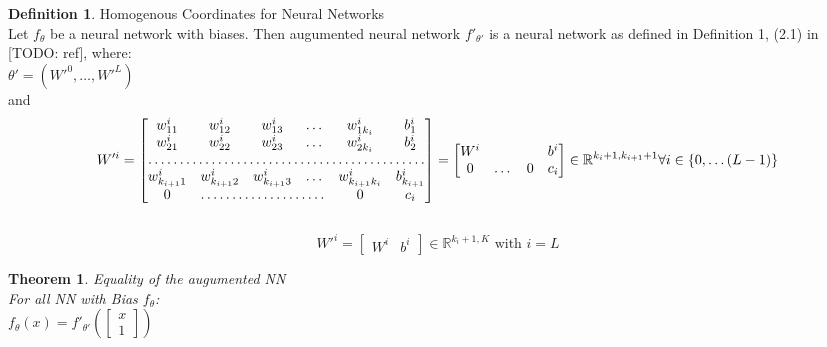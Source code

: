 \documentclass[a4paper]{article}
\newtheorem{theorem}{Theorem}[section]
\theoremstyle{definition}
\newtheorem{definition}{Definition}[section]
\begin{document}
\theoremstyle{definition}
\begin{definition}{Homogenous Coordinates for Neural Networks}\\
Let $f_{\theta}$ be a neural network with biases. Then augumented neural network $f'_{\theta'}$ is a neural network as defined in Definition 1, (2.1) in [TODO: ref], where:\\
$\theta' = (W'^0, \dots, W'^L)$\\
and\\
\[
W'^i=\begin{bmatrix}
    w_{11}^i       & w_{12}^i & w_{13}^i & \dots & w_{1k_i}^i & b_1^i\\
    w_{21}^i       & w_{22}^i & w_{23}^i & \dots & w_{2k_i}^i & b_2^i\\
    \hdotsfor{6} \\
	w_{k_{i+1}1}^i       & w_{k_{i+1}2}^i & w_{k_{i+1}3}^i & \dots & w_{k_{i+1}k_i}^i & b_{k_{i+1}}^i\\
	0 & \hdotsfor{3} & 0 & c_i
\end{bmatrix}
= 
\begin{bmatrix}
    W^i & & & b^i\\
	0 & \dots & 0 & c_i
\end{bmatrix} \in \mathbb{R}^{k_i + 1, k_{i + 1} + 1}  \forall i \in \{0, \dots (L-1)\}
\]\\
\[
W'^i=
\begin{bmatrix}
    W^i & b^i
\end{bmatrix} \in \mathbb{R}^{k_i + 1, K}  \text{ with } i = L
\]
\end{definition}

\begin{theorem}{Equality of the augumented NN}\\
For all NN with Bias $f_{\theta}$:\\
$f_{\theta}(x)=f'_{\theta'}(\begin{bmatrix}     x\\     1 \end{bmatrix})$
\end{theorem}
\end{document}
